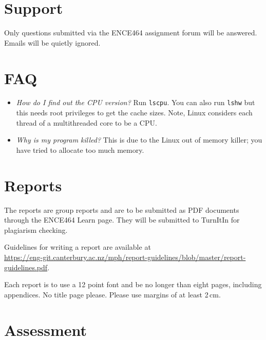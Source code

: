 \documentclass[a4paper,11pt]{article}
\newcommand{\code}[1]{\texttt{#1}}
\begin{document}
\section{Support}

Only questions submitted via the ENCE464 assignment forum will be
answered.  Emails will be quietly ignored.


\section{FAQ}

\begin{itemize}
\item \emph{How do I find out the CPU version?}  Run \code{lscpu}.
  You can also run \code{lshw} but this needs root privileges to get
  the cache sizes.  Note, Linux considers each thread of a
  multithreaded core to be a CPU.

\item \emph{Why is my program killed?}  This is due to the Linux out
  of memory killer; you have tried to allocate too much memory.

\end{itemize}



\section{Reports}

The reports are group reports and are to be submitted as PDF documents
through the ENCE464 Learn page.  They will be submitted to TurnItIn
for plagiarism checking.

Guidelines for writing a report are available at\\
\url{https://eng-git.canterbury.ac.nz/mph/report-guidelines/blob/master/report-guidelines.pdf}.

Each report is to use a 12 point font and be no longer than eight
pages, including appendices.  No title page please.  Please use
margins of at least 2\,cm.


\section{Assessment}
\end{document}
